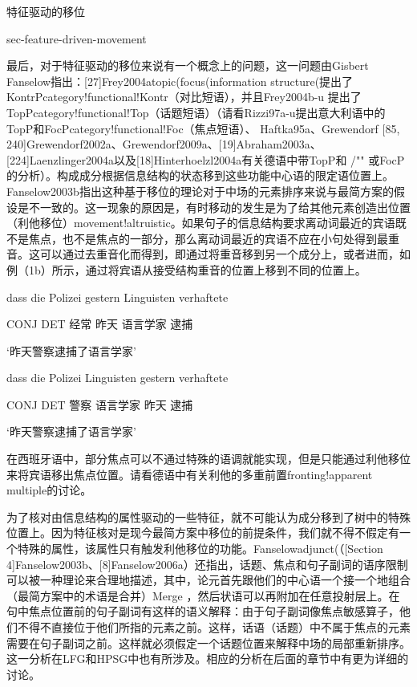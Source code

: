 特征驱动的移位

sec-feature-driven-movement

最后，对于特征驱动的移位来说有一个概念上的问题，这一问题由Gisbert Fanselow指出：[27]Frey2004atopic(focus(information structure(提出了KontrPcategory!functional!Kontr（对比短语），并且Frey2004b-u 提出了TopPcategory!functional!Top（话题短语）（请看Rizzi97a-u提出意大利语中的TopP和FocPcategory!functional!Foc（焦点短语）、 
Haftka95a、Grewendorf [85, 240]Grewendorf2002a、Grewendorf2009a、[19]Abraham2003a、[224]Laenzlinger2004a以及[18]Hinterhoelzl2004a有关德语中带TopP和 /"" 或FocP的分析）。构成成分根据信息结构的状态移到这些功能中心语的限定语位置上。Fanselow2003b指出这种基于移位的理论对于中场的元素排序来说与最简方案的假设是不一致的。这一现象的原因是，有时移动的发生是为了给其他元素创造出位置（利他移位）movement!altruistic。如果句子的信息结构要求离动词最近的宾语既不是焦点，也不是焦点的一部分，那么离动词最近的宾语不应在小句处得到最重音。这可以通过去重音化而得到，即通过将重音移到另一个成分上，或者进而，如例（1b）所示，通过将宾语从接受结构重音的位置上移到不同的位置上。



















dass die Polizei gestern Linguisten verhaftete

	 CONJ DET 经常 昨天 语言学家 逮捕

`昨天警察逮捕了语言学家'



dass die Polizei Linguisten gestern verhaftete

	 CONJ DET 警察 语言学家 昨天 逮捕

`昨天警察逮捕了语言学家'




在西班牙语中，部分焦点可以不通过特殊的语调就能实现，但是只能通过利他移位来将宾语移出焦点位置。请看德语中有关利他的多重前置fronting!apparent multiple的讨论。



为了核对由信息结构的属性驱动的一些特征，就不可能认为成分移到了树中的特殊位置上。因为特征核对是现今最简方案中移位的前提条件，我们就不得不假定有一个特殊的属性，该属性只有触发利他移位的功能。Fanselowadjunct(（[Section 4]Fanselow2003b、[8]Fanselow2006a）还指出，话题、焦点和句子副词的语序限制可以被一种理论来合理地描述，其中，论元首先跟他们的中心语一个接一个地组合（最简方案中的术语是合并）Merge ，然后状语可以再附加在任意投射层上。在句中焦点位置前的句子副词有这样的语义解释：由于句子副词像焦点敏感算子，他们不得不直接位于他们所指的元素之前。这样，话语（话题）中不属于焦点的元素需要在句子副词之前。这样就必须假定一个话题位置来解释中场的局部重新排序。这一分析在LFG和HPSG中也有所涉及。相应的分析在后面的章节中有更为详细的讨论。










